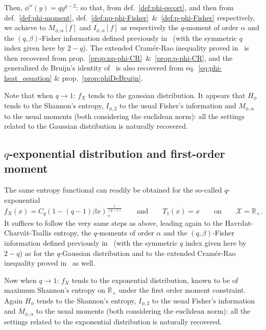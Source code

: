 \documentclass[entropy,article,submit,moreauthors,pdftex]{Definitions/mdpi}
\newcommand{\SZ}[1]{{\color{blue} #1}}                                       %
\def\Rset{\mathbb{R}}%
\def\X{\mathcal{X}}%
\begin{document}
Then, $\phi''(y) = q y^{q-2}$:  \SZ{so that, from def.~\ref{def:phi-escort}, and
  then                      from                      def.~\ref{def:phi-moment},
  def.~\ref{def:np-phi-Fisher}~\&~\ref{def:p-phi-Fisher}     respectively,    we
  achieve to $M_{\phi,\alpha}[f]$ and  $I_{\phi,\alpha}[f]$ as} respectively the
$q$-moment  of order  $\alpha$  and the  $(q,\beta)$-Fisher information  defined
previously in~\cite{LutYan05, LutYan07,  LutLv12, Ber12:06_1, Ber12:06_2, Ber13}
(with the  symmetric $q$ index given  here by $2-q$). The  extended Cram\'er-Rao
inequality  proved  in~\cite{LutYan05,  Ber12:06_2,  Ber13}  is  then  recovered
\SZ{from prop.~\ref{prop:np-phi-CR}~\&~\ref{prop:p-phi-CR},  and the generalized
  de   Bruijn's    identity   of~\cite{Ber13:08}   is   also    recovered   from
  eq.~\eqref{eq:phi-heat_equation} \& prop.~\ref{prop:phiDeBruijn}.}

Note that when $q  \to 1$: $f_X$ tends to the  gaussian distribution. It appears
that $H_\phi$ tends to the Shannon's entropy, $I_{\phi,2}$ to the usual Fisher's
information and  $M_{\phi,\alpha}$ to  the usual  moments (both  considering the
euclidean  norm): all  the  settings  related to  the  Gaussian distribution  is
naturally recovered.




\subsection{$q$-exponential distribution and first-order moment}
\label{subsecapp:qExponentialFirstOrder}

The  same  entropy  functional  can   readily  be  obtained  for  the  so-called
$q$-exponential
% 
\[
f_X(x)  =  C_q \left(  1  -  (q-1)  \beta x  \right)_+^{\frac{1}{(q-1)}}  \qquad
\mbox{and} \qquad T_1(x) = x \qquad \mbox{on} \qquad \X = \Rset_+.
\]
%
It  suffices to  follow the  very  same steps  as  above, leading  again to  the
Havrdat-Charv\'at-Tsallis  entropy, the  $q$-moments of  order $\alpha$  and the
$(q,\beta)$-Fisher information  defined previously  in~\cite{LutYan05, LutYan07,
  LutLv12, Ber12:06_1,  Ber12:06_2, Ber13} (with  the symmetric $q$  index given
here  by  $2-q$) as  for  the  $q$-Gaussian  distribution  and to  the  extended
Cram\'er-Rao inequality proved in~\cite{Ber12:06_2, Ber13} as well.

Now when $q \to 1$: $f_X$ tends  to the exponential distribution, known to be of
maximum  Shannon's   entropy  on   $\Rset_+$  under   the  first   order  moment
constraint. Again $H_\phi$  tends to the Shannon's entropy,  $I_{\phi,2}$ to the
usual  Fisher's information  and $M_{\phi,\alpha}$  to the  usual moments  (both
considering the  euclidean norm):  all the settings  related to  the exponential
distribution is naturally recovered.
\end{document}

